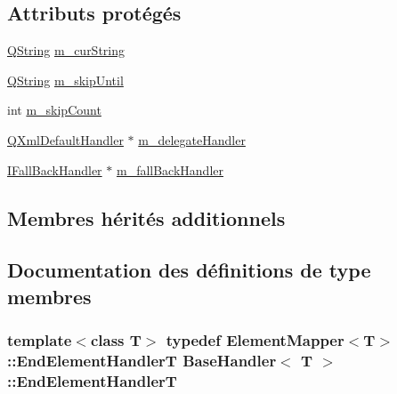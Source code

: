\subsection*{Attributs protégés}
\begin{DoxyCompactItemize}
\item 
\hyperlink{class_q_string}{Q\+String} \hyperlink{class_base_handler_a465e89308ad37f5fe49c2d64365584eb}{m\+\_\+cur\+String}
\item 
\hyperlink{class_q_string}{Q\+String} \hyperlink{class_base_handler_a8e2ef23c5a489fe981e33eba88538635}{m\+\_\+skip\+Until}
\item 
int \hyperlink{class_base_handler_a2227d419cfd154559297bc9599fc9d3d}{m\+\_\+skip\+Count}
\item 
\hyperlink{class_q_xml_default_handler}{Q\+Xml\+Default\+Handler} $\ast$ \hyperlink{class_base_handler_af433dd7ab3c72d3cff916cff4c1790f3}{m\+\_\+delegate\+Handler}
\item 
\hyperlink{class_i_fall_back_handler}{I\+Fall\+Back\+Handler} $\ast$ \hyperlink{class_base_handler_af6dba84c4d282e5af104cff6d0967bcf}{m\+\_\+fall\+Back\+Handler}
\end{DoxyCompactItemize}
\subsection*{Membres hérités additionnels}


\subsection{Documentation des définitions de type membres}
\hypertarget{class_base_handler_a3cad3be3bcd3f337d8032d51d555053e}{}
\subsubsection[{End\+Element\+Handler\+T}]{\setlength{\rightskip}{0pt plus 5cm}template$<$class T$>$ typedef {\bf Element\+Mapper}$<$T$>$\+::{\bf End\+Element\+Handler\+T} {\bf Base\+Handler}$<$ T $>$\+::{\bf End\+Element\+Handler\+T}}\label{class_base_handler_a3cad3be3bcd3f337d8032d51d555053e}
\hypertarget{class_base_handler_abd6c0f29385e3c9d63d739cd053e2d9b}{}
